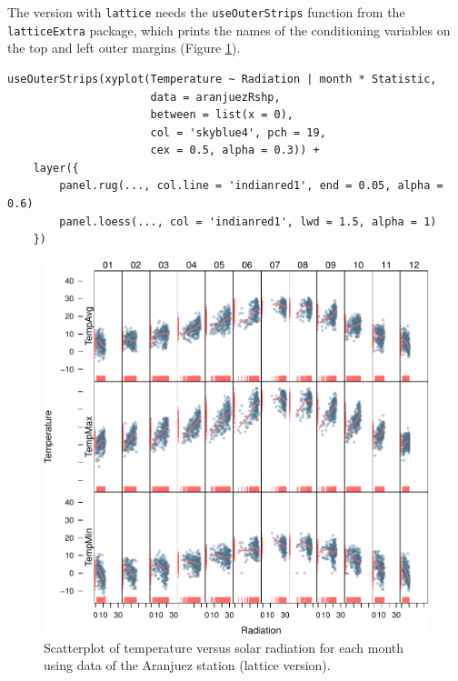 \documentclass[smallroyalvopaper]{memoir}
\begin{document}
The version with \texttt{lattice} needs the \texttt{useOuterStrips} function from
the \texttt{latticeExtra} package, which prints the names of the conditioning
variables on the top and left outer margins (Figure
 \ref{fig:aranjuezOuterStrips}).


\lstset{language=r,label= ,caption= ,captionpos=b,numbers=none}
\begin{lstlisting}
useOuterStrips(xyplot(Temperature ~ Radiation | month * Statistic,
                      data = aranjuezRshp,
                      between = list(x = 0),
                      col = 'skyblue4', pch = 19,
                      cex = 0.5, alpha = 0.3)) +
    layer({
        panel.rug(..., col.line = 'indianred1', end = 0.05, alpha = 0.6)
        panel.loess(..., col = 'indianred1', lwd = 1.5, alpha = 1)
    })
\end{lstlisting}

\begin{figure}[htbp]
\centering
\includegraphics[width=.9\linewidth]{figs/aranjuezOuterStrips.pdf}
\caption{Scatterplot of temperature versus solar radiation for each month using data of the Aranjuez station (lattice version). \label{fig:aranjuezOuterStrips}}
\end{figure}
\end{document}
